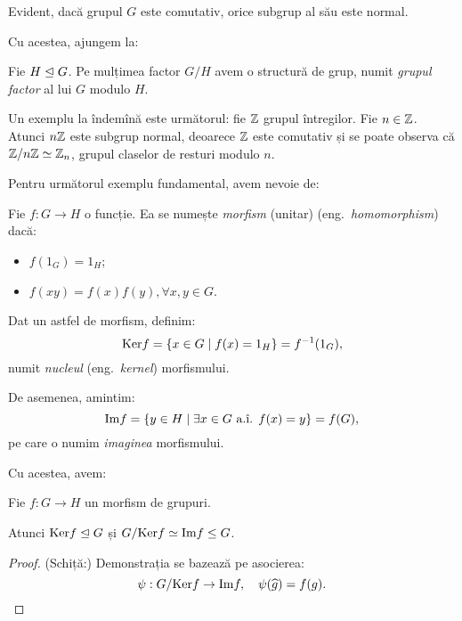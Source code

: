 \begin{remark}\label{rk:normal-com}
  Evident, dacă grupul $ G $ este comutativ, orice subgrup al său este normal.
\end{remark}

Cu acestea, ajungem la:
\begin{definition}\label{def:gr-factor} 
  Fie $ H \trianglelefteq G $. Pe mulțimea factor $ G/H $ avem o structură de
  grup, numit \emph{grupul factor} al lui $ G $ modulo $ H $.
\end{definition}

Un exemplu la îndemînă este următorul: fie $ \mathbb{Z} $ grupul întregilor.
Fie $ n \in \mathbb{Z} $. Atunci $ n\mathbb{Z} $ este subgrup normal, deoarece $ \mathbb{Z} $
este comutativ și se poate observa că $ \mathbb{Z}/n\mathbb{Z} \simeq \mathbb{Z}_n $, grupul
claselor de resturi modulo $ n $.

Pentru următorul exemplu fundamental, avem nevoie de:
\begin{definition}\label{def:morfism} 
  Fie $ f : G \to H $ o funcție. Ea se numește \emph{morfism} (unitar)
  (eng.\ \emph{homomorphism}) dacă:
  \begin{itemize}
  \item $ f(1_G) = 1_H $;
  \item $ f(xy) = f(x) f(y), \forall x, y \in G $.
  \end{itemize}
\end{definition}

Dat un astfel de morfism, definim:
\[
  \mathrm{Ker}f = \{ x \in G \mid f(x) = 1_H \} = f^{-1}(1_G),
\]
numit \emph{nucleul} (eng.\ \emph{kernel}) morfismului. 

De asemenea, amintim:
\[
  \mathrm{Im}f = \{ y \in H \mid \exists x \in G \text{ a.î. } f(x) = y \} = f(G),
\]
pe care o numim \emph{imaginea} morfismului. 

Cu acestea, avem:
\begin{theorem}
  \label{thm:tfi} 
  Fie $ f : G \to H $ un morfism de grupuri.

  Atunci $ \mathrm{Ker} f \trianglelefteq G $ și $ G/\mathrm{Ker}f \simeq \mathrm{Im}f \leq G $.
\end{theorem}

\begin{proof}
  (Schiță:) Demonstrația se bazează pe asocierea:
  \[
    \psi : G/\mathrm{Ker}f \to \mathrm{Im}f, \quad \psi(\widehat{g}) = f(g).
  \]
\end{proof}

